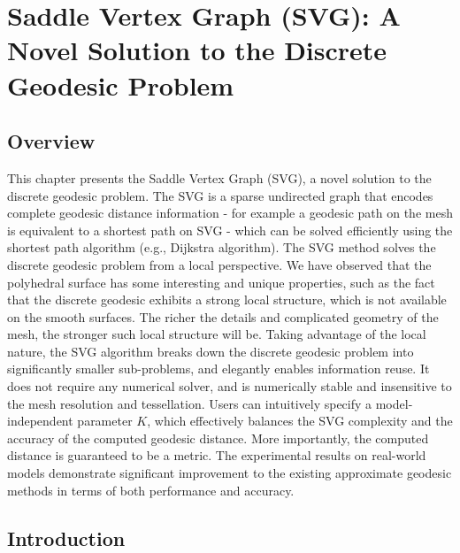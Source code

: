 \chapter{Saddle Vertex Graph (SVG): A Novel Solution to the Discrete Geodesic Problem}


\section{Overview}\label{sec:svg-overview}

This chapter presents the Saddle Vertex Graph (SVG), a novel solution
to the discrete geodesic problem. The SVG is a sparse undirected
graph that encodes complete geodesic distance information - for
example a geodesic path on the mesh is equivalent to a shortest path
on SVG - which can be solved efficiently using the shortest path
algorithm (e.g., Dijkstra algorithm). The SVG method solves the
discrete geodesic problem from a local perspective. We have observed
that the polyhedral surface has some interesting and unique
properties, such as the fact that the discrete geodesic exhibits a
strong local structure, which is not available on the smooth
surfaces. The richer the details and complicated geometry of the
mesh, the stronger such local structure will be. Taking advantage of
the local nature, the SVG algorithm breaks down the discrete
geodesic problem into significantly smaller sub-problems, and
elegantly enables information reuse. It does not require any
numerical solver, and is numerically stable and insensitive to the
mesh resolution and tessellation. Users can intuitively specify a
model-independent parameter $K$, which effectively balances the SVG
complexity and the accuracy of the computed geodesic distance. More
importantly, the computed distance is guaranteed to be a metric. The
experimental results on real-world models demonstrate significant
improvement to the existing approximate geodesic methods in terms of
both performance and accuracy.


\section{Introduction}
\label{sec:svg-intro}

